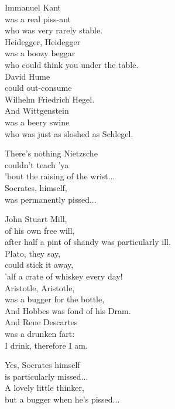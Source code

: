 Immanuel Kant\\
was a real piss-ant\\
who was very rarely stable.\\
Heidegger, Heidegger\\
was a boozy beggar\\
who could think you under the table.\\
David Hume\\
could out-consume\\
Wilhelm Friedrich Hegel.\\
And Wittgenstein\\
was a beery swine\\
who was just as sloshed as Schlegel.

There's nothing Nietzsche\\
couldn't teach 'ya\\
'bout the raising of the wrist...\\
Socrates, himself,\\
was permanently pissed...

John Stuart Mill,\\
of his own free will,\\
after half a pint of shandy was particularly ill.\\
Plato, they say,\\
could stick it away,\\
'alf a crate of whiskey every day!\\
Aristotle, Aristotle,\\
was a bugger for the bottle,\\
And Hobbes was fond of his Dram.\\
And Rene Descartes\\
was a drunken fart:\\
I drink, therefore I am.

Yes, Socrates himself\\
is particularly missed...\\
A lovely little thinker,\\
but a bugger when he's pissed...

